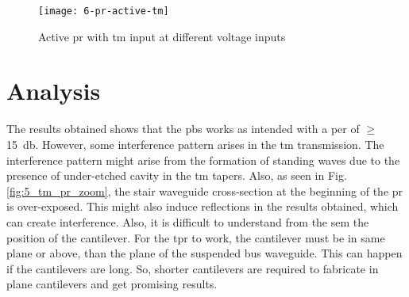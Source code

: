 \documentclass[../report.tex]{subfiles}
\begin{document}
	\begin{figure}[H] %
		\centering
		\texttt{[image: 6-pr-active-tm]}
		\caption{Active \gls{pr} with \gls{tm} input at different voltage inputs}
		\label{fig:6_pr_active_tm}
	\end{figure}
	
	\section{Analysis}
	The results obtained shows that the \gls{pbs} works as intended with a \gls{per} of $\geq$ \SI{15}{\decibel}. However, some interference pattern arises in the \gls{tm} transmission. The interference pattern might arise from the formation of standing waves due to the presence of under-etched cavity in the \gls{tm} tapers. Also, as seen in Fig. \ref{fig:5_tm_pr_zoom}, the stair waveguide cross-section at the beginning of the \gls{pr} is over-exposed. This might also induce reflections in the results obtained, which can create interference. Also, it is difficult to understand from the \gls{sem} the position of the cantilever. For the \gls{tpr} to work, the cantilever must be in same plane or above, than the plane of the suspended bus waveguide. This can happen if the cantilevers are long. So, shorter cantilevers are required to fabricate in plane cantilevers and get promising results.
\end{document}
